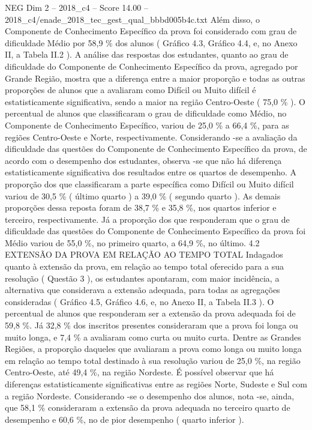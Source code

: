 \begin{textsample}{NEG Dim 2 – 2018\_c4 – Score 14.00 – 2018\_c4/enade\_2018\_tec\_gest\_qual\_bbbd005b4c.txt}
Além disso, o Componente de Conhecimento Específico da prova foi considerado com grau de dificuldade Médio por 58,9 \% dos alunos ( Gráfico 4.3, Gráfico 4.4, e, no Anexo II, a Tabela II.2 ).
A análise das respostas dos estudantes, quanto ao grau de dificuldade do Componente de Conhecimento Específico da prova, agregado por Grande Região, mostra que a diferença entre a maior proporção e todas as outras proporções de alunos que a avaliaram como Difícil ou Muito difícil é estatisticamente significativa, sendo a maior na região Centro-Oeste ( 75,0 \% ).
O percentual de alunos que classificaram o grau de dificuldade como Médio, no Componente de Conhecimento Específico, variou de 25,0 \% a 66,4 \%, para as regiões Centro-Oeste e Norte, respectivamente.
Considerando -se a avaliação da dificuldade das questões do Componente de Conhecimento Específico da prova, de acordo com o desempenho dos estudantes, observa -se que não há diferença estatisticamente significativa dos resultados entre os quartos de desempenho.
A proporção dos que classificaram a parte específica como Difícil ou Muito difícil variou de 30,5 \% ( último quarto ) a 39,0 \% ( segundo quarto ).
As demais proporções dessa reposta foram de 38,7 \% e 35,8 \%, nos quartos inferior e terceiro, respectivamente.
Já a proporção dos que responderam que o grau de dificuldade das questões do Componente de Conhecimento Específico da prova foi Médio variou de 55,0 \%, no primeiro quarto, a 64,9 \%, no último. 4.2 EXTENSÃO DA PROVA EM RELAÇÃO AO TEMPO TOTAL Indagados quanto à extensão da prova, em relação ao tempo total oferecido para a sua resolução ( Questão 3 ), os estudantes apontaram, com maior incidência, a alternativa que considerava a extensão adequada, para todas as agregações consideradas ( Gráfico 4.5, Gráfico 4.6, e, no Anexo II, a Tabela II.3 ).
O percentual de alunos que responderam ser a extensão da prova adequada foi de 59,8 \%.
Já 32,8 \% dos inscritos presentes consideraram que a prova foi longa ou muito longa, e 7,4 \% a avaliaram como curta ou muito curta.
Dentre as Grandes Regiões, a proporção daqueles que avaliaram a prova como longa ou muito longa em relação ao tempo total destinado à sua resolução variou de 25,0 \%, na região Centro-Oeste, até 49,4 \%, na região Nordeste.
É possível observar que há diferenças estatisticamente significativas entre as regiões Norte, Sudeste e Sul com a região Nordeste.
Considerando -se o desempenho dos alunos, nota -se, ainda, que 58,1 \% consideraram a extensão da prova adequada no terceiro quarto de desempenho e 60,6 \%, no de pior desempenho ( quarto inferior ).

\end{textsample}
